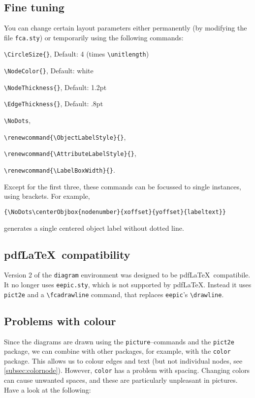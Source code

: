 \documentclass[12pt]{article}
\begin{document}
\subsection{Fine tuning}
You can change certain layout parameters either permanently (by modifying the
file \texttt{fca.sty}) or temporarily using the following commands:
\begin{trivlist}
\item \verb|\CircleSize{}|,  \hspace*{3.5ex}\qquad Default: 4\qquad
(times \verb|\unitlength|)
\item \verb|\NodeColor{}|,  \qquad\qquad Default: white
\item \verb|\NodeThickness{}|,  \qquad Default: 1.2pt
\item \verb|\EdgeThickness{}|,  \qquad Default: .8pt
\item \verb|\NoDots|,
\item \verb|\renewcommand{\ObjectLabelStyle}{}|,
\item \verb|\renewcommand{\AttributeLabelStyle}{}|, 
\item \verb|\renewcommand{\LabelBoxWidth}{}|.    
\end{trivlist}
Except for the first three, these commands can be focussed to single instances,
using brackets. For example,
\begin{center}
\verb|{\NoDots\centerObjbox{nodenumber}{xoffset}{yoffset}{labeltext}}|
\end{center}
generates a single centered object label without dotted line.

\subsection{pdf\LaTeX \ compatibility}
Version 2 of the \texttt{diagram} environment was designed to be pdf\LaTeX\
compatibile. It no longer uses \texttt{eepic.sty}, which is not supported by
pdf\LaTeX. Instead it uses \texttt{pict2e} and a \verb|\fcadrawline| command,
that replaces \texttt{eepic}'s \verb|\drawline|. 

\subsection{Problems with colour}
Since the diagrams are drawn using the \texttt{picture}--commands and the
\texttt{pict2e} package, we can combine with other packages, for example, with
the \texttt{color} package. This allows us to colour edges and text (but not
individual nodes, see \ref{subsec:colornode}).
However, \texttt{color} has a problem with spacing. Changing colors can cause
unwanted spaces, and these are particularly unpleasant in pictures. Have a
look at the following:\medbreak
\end{document}
